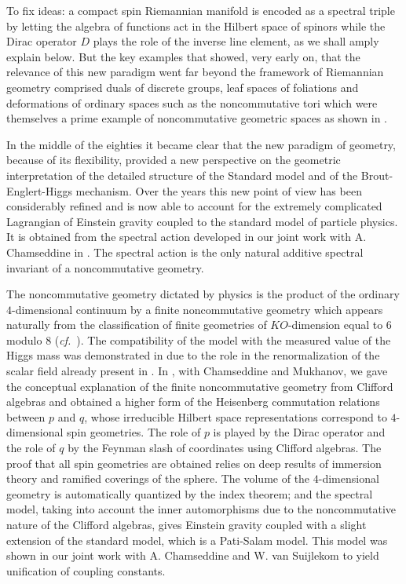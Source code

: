\documentclass[12pt]{article}
\newcommand{\cf}{{\it cf.\/}\ }
\begin{document}
 To fix ideas: a compact spin Riemannian manifold is encoded as a spectral triple by letting the algebra of functions act in the Hilbert space of spinors while the Dirac operator $D$ plays the role of the inverse line element, as we shall amply explain below. But the key examples that showed, very early on, that the relevance of this new paradigm went far beyond the framework of Riemannian geometry comprised duals of discrete groups, leaf spaces of foliations and deformations of ordinary spaces such as the noncommutative tori which were themselves a prime example of noncommutative geometric spaces as shown in \cite{Co-CR}.
 
  In the middle of the eighties it became clear that the new paradigm of geometry, because of its flexibility, provided a new perspective on the geometric interpretation of the detailed  structure of the Standard model and of the Brout-Englert-Higgs mechanism. Over the years this new point of view has been considerably refined and is now able to account for the 
 extremely complicated Lagrangian of Einstein gravity coupled to the standard model of particle physics. It is obtained from the spectral action developed in our joint work with A. Chamseddine in \cite{cc2}. The spectral action is the only natural additive spectral invariant of a noncommutative geometry.
 
  The noncommutative geometry dictated by physics is the product of the ordinary $4$-dimensional continuum by a finite noncommutative geometry which appears naturally from the classification of finite geometries of $KO$-dimension equal to $6$ modulo $8$ (\cf \cite{cc5,mc2}). The compatibility of the model with the measured value of the Higgs mass was demonstrated in \cite{acresil} due to the role in the renormalization of the scalar field already present in  \cite{ac2010}.  In \cite{acmu1,acmu2}, with Chamseddine and Mukhanov, we gave the conceptual explanation of the finite noncommutative geometry from Clifford algebras and obtained a higher form of the Heisenberg commutation relations between $p$ and $q$, whose irreducible Hilbert space representations correspond to $4$-dimensional spin geometries. The role of $p$ is played by the 
Dirac operator and the role of $q$ by the Feynman slash of coordinates using Clifford algebras. The proof that all spin geometries are obtained relies on deep results of immersion theory and ramified coverings of the sphere.  The volume of the $4$-dimensional geometry is automatically quantized by the index theorem; and the  spectral model, taking into account the inner automorphisms due to the noncommutative nature of the Clifford algebras, gives Einstein gravity coupled with a slight extension of the standard model, which is a Pati-Salam model. This model was shown in our joint work with A. Chamseddine and W. van Suijlekom \cite{acpati1,acpati2} to yield unification of coupling constants.
\end{document}

